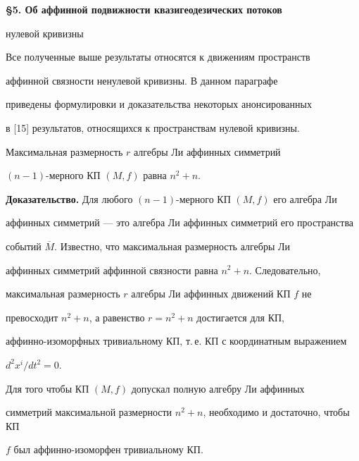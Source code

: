 \medskip





\begin{center}


{\bf \S 5. Об аффинной подвижности квазигеодезических потоков


нулевой кривизны}


\end{center}


\medskip





Все полученные выше результаты относятся к движениям пространств


аффинной связности ненулевой кривизны. В данном параграфе


приведены формулировки и доказательства некоторых анонсированных


в [15] результатов, относящихся к пространствам нулевой кривизны.





\begin{thm}


Максимальная размерность $r$ алгебры Ли аффинных симметрий


$(n-1)$-мерного КП $(M,f) $ равна $n^2+n$.


\end{thm}





{\bf Доказательство.} Для любого $(n-1)$-мерного КП $(M,f) $ его алгебра Ли


аффинных симметрий --- это алгебра Ли аффинных симметрий его пространства


событий $\overline{M} $. Известно, что максимальная размерность алгебры Ли


аффинных симметрий аффинной связности равна $n^2+n$. Следовательно,


максимальная размерность $r$ алгебры Ли аффинных движений КП $f$ не


превосходит $n^2+n$, а равенство $r=n^2+n$ достигается для КП,


аффинно-изоморфных тривиальному КП, т.\,е. КП с координатным выражением


${d^2x^i}/{dt^2}=0$.





\begin{thm}


Для того чтобы КП $(M,f) $ допускал полную алгебру Ли аффинных


симметрий максимальной размерности $n^2+n$, необходимо и достаточно, чтобы КП


$f$ был аффинно-изоморфен тривиальному КП.


\end{thm}





